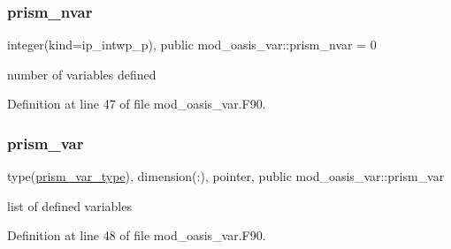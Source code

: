 \subsubsection{\texorpdfstring{prism\+\_\+nvar}{prism\_nvar}}
{\footnotesize\ttfamily integer(kind=ip\+\_\+intwp\+\_\+p), public mod\+\_\+oasis\+\_\+var\+::prism\+\_\+nvar = 0}



number of variables defined 



Definition at line 47 of file mod\+\_\+oasis\+\_\+var.\+F90.

\mbox{\label{namespacemod__oasis__var_ae66c490437c2960d795fbd3d2c773a0a}} 
\subsubsection{\texorpdfstring{prism\+\_\+var}{prism\_var}}
{\footnotesize\ttfamily type(\hyperlink{structmod__oasis__var_1_1prism__var__type}{prism\+\_\+var\+\_\+type}), dimension(\+:), pointer, public mod\+\_\+oasis\+\_\+var\+::prism\+\_\+var}



list of defined variables 



Definition at line 48 of file mod\+\_\+oasis\+\_\+var.\+F90.

